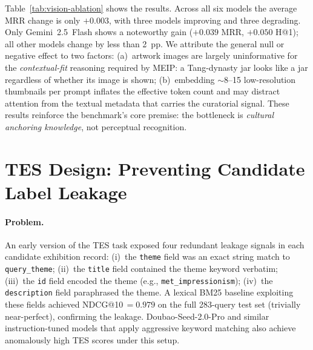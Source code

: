 \documentclass[11pt]{article}
\begin{document}
Table~\ref{tab:vision-ablation} shows the results.
Across all six models the average MRR change is only $+0.003$,
with three models improving and three degrading.
Only Gemini~2.5~Flash shows a noteworthy gain ($+0.039$ MRR,
$+0.050$ H@1); all other models change by less than 2~pp.
We attribute the general null or negative effect to two factors:
(a)~artwork images are largely uninformative for the
\emph{contextual-fit} reasoning required by MEIP: a Tang-dynasty
jar looks like a jar regardless of whether its image is shown;
(b)~embedding $\sim$8--15 low-resolution thumbnails per prompt
inflates the effective token count and may distract attention from
the textual metadata that carries the curatorial signal.
These results reinforce the benchmark's core premise:
the bottleneck is \emph{cultural anchoring knowledge},
not perceptual recognition.



\section{TES Design: Preventing Candidate Label Leakage}
\label{app:leakage}

\paragraph{Problem.}
An early version of the TES task exposed four redundant leakage signals
in each candidate exhibition record:
(i)~the \texttt{theme} field was an exact string match to \texttt{query\_theme};
(ii)~the \texttt{title} field contained the theme keyword verbatim;
(iii)~the \texttt{id} field encoded the theme (e.g., \texttt{met\_impressionism});
(iv)~the \texttt{description} field paraphrased the theme.
A lexical BM25 baseline exploiting these fields achieved NDCG@10\,$=0.979$ on
the full 283-query test set (trivially near-perfect), confirming the leakage.
Doubao-Seed-2.0-Pro and similar instruction-tuned models that apply aggressive
keyword matching also achieve anomalously high TES scores under this setup.
\end{document}
